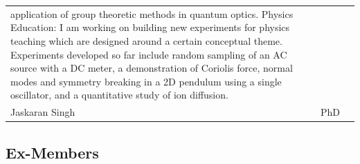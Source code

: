 \documentclass[11pt]{article}
\begin{document}
\begin{center}
\begin{tabular}{lll}
application of group theoretic methods in quantum optics. Physics Education: I am working on building new experiments for physics teaching which are designed around a certain conceptual theme. Experiments developed so far include random sampling of an AC source with a DC meter, a demonstration of Coriolis force, normal modes and symmetry breaking in a 2D pendulum using a single oscillator, and a quantitative study of ion diffusion.\\
Jaskaran Singh & PhD & \\
\end{tabular}
\end{center}


\subsection{Ex-Members}
\label{sec-2-2}
\end{document}
